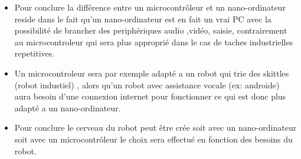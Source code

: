 \documentclass{beamer}
\begin{document}
\begin{frame}
\begin{itemize}
    \item Pour conclure la différence entre un microcontrôleur et un nano-ordinateur reside dans le fait qu'un nano-ordinateur est en fait un vrai PC avec la possibilité de brancher des periphériques audio ,vidéo, saisie, contrairement au microcontroleur qui sera plus approprié dans le cas de taches industrielles repetitives.
  \item Un microcontroleur sera par exemple adapté a un robot qui trie des skittles (robot industiel) , alors qu'un robot avec assistance vocale (ex: androide) aura besoin d'une connexion internet pour fonctionner ce qui est donc plus adapté a un nano-ordinateur.
\item Pour conclure le cerveau du robot peut être crée soit avec un nano-ordinateur soit avec un microcontrôleur le choix sera effectué en fonction des besoins du robot.
\end{itemize}
\end{frame}
\end{document}
